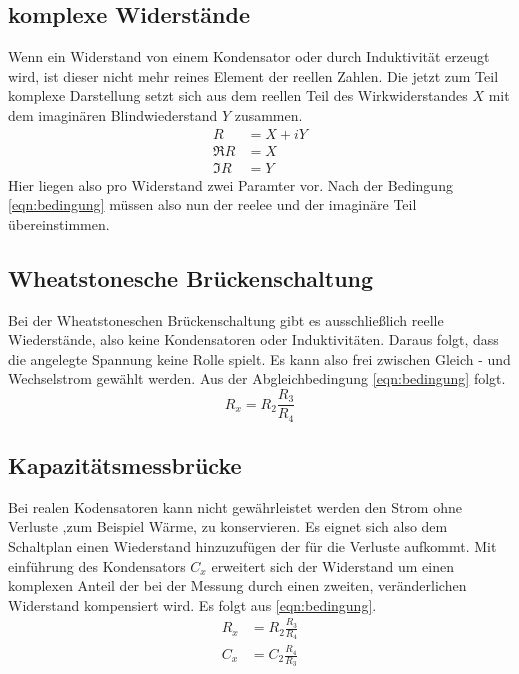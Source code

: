 \subsection{komplexe Widerstände}
Wenn ein Widerstand von einem Kondensator oder durch Induktivität erzeugt wird, ist dieser nicht mehr reines 
Element der reellen Zahlen. 
Die jetzt zum Teil komplexe Darstellung setzt sich aus dem reellen Teil des Wirkwiderstandes $X$ mit 
dem imaginären Blindwiederstand $Y$ zusammen. 
\begin{align*}
    R &= X +iY \\
    \Re{R} &= X \\
    \Im{R} &= Y 
\end{align*} 
Hier liegen also pro Widerstand zwei Paramter vor. Nach der Bedingung \eqref{eqn:bedingung} müssen also
nun der reelee und der imaginäre Teil übereinstimmen. 

\subsection{Wheatstonesche Brückenschaltung}
Bei der Wheatstoneschen Brückenschaltung gibt es ausschließlich reelle Wiederstände, also  keine Kondensatoren
oder Induktivitäten. Daraus folgt, dass die angelegte Spannung keine Rolle spielt. Es kann also frei zwischen
Gleich - und Wechselstrom gewählt werden. Aus der Abgleichbedingung \eqref{eqn:bedingung} folgt.
\begin{equation}
    R_x = R_2 \frac{R_3}{R_4}
\end{equation}

\subsection{Kapazitätsmessbrücke}
Bei realen Kodensatoren kann nicht gewährleistet werden den Strom ohne Verluste ,zum Beispiel Wärme, 
zu konservieren. Es eignet sich also dem Schaltplan einen Wiederstand hinzuzufügen der für die Verluste aufkommt.
Mit einführung des Kondensators $C_x$ erweitert sich der Widerstand um einen komplexen Anteil der bei der Messung durch 
einen zweiten, veränderlichen Widerstand kompensiert wird. 
Es folgt aus \eqref{eqn:bedingung}.
\begin{align}
    R_x &= R_2\frac{R_3}{R_4} \\
    C_x &= C_2\frac{R_4}{R_3}
\end{align}

